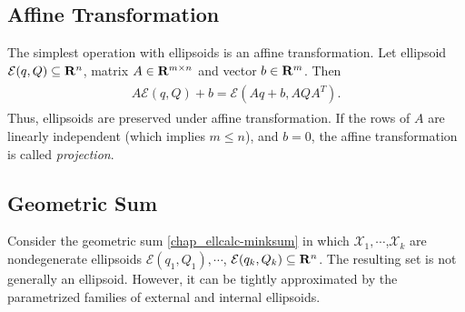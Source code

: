 \documentclass[letterpaper,10pt,english]{sphinxmanual}
\begin{document}
\subsection{Affine Transformation}
\label{chap_ellcalc:affine-transformation}
The simplest operation with ellipsoids is an affine transformation. Let
ellipsoid \({\mathcal E}(q,Q)\subseteq{\bf R}^n\), matrix
\(A\in{\bf R}^{m\times n}\) and vector \(b\in{\bf R}^m\). Then
\label{chap_ellcalc:equation-affinetrans}\begin{gather}
\begin{split}A{\mathcal E}(q,Q) + b = {\mathcal E}(Aq+b, AQA^T) .\end{split}\label{chap_ellcalc-affinetrans}
\end{gather}
Thus, ellipsoids are preserved under affine transformation. If the rows
of \(A\) are linearly independent (which implies
\(m\leqslant n\)), and \(b=0\), the affine transformation is
called \emph{projection}.


\subsection{Geometric Sum}
\label{chap_ellcalc:geometric-sum}
Consider the geometric sum \eqref{chap_ellcalc-minksum} in which
\({\mathcal X}_1,\cdots\),\({\mathcal X}_k\) are nondegenerate
ellipsoids \({\mathcal E}(q_1,Q_1),\cdots\),
\({\mathcal E}(q_k,Q_k)\subseteq{\bf R}^n\). The resulting set is
not generally an ellipsoid. However, it can be tightly approximated by
the parametrized families of external and internal ellipsoids.
\end{document}
